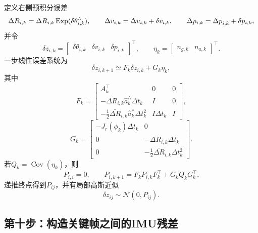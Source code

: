 定义右侧预积分误差
\[
    \Delta R_{i,k}
    =\bar{\Delta R}_{i,k}\operatorname{Exp}(\delta\theta_{i,k}^\wedge),
    \qquad
    \Delta v_{i,k}=\bar{\Delta v}_{i,k}+\delta v_{i,k},
    \qquad
    \Delta p_{i,k}=\bar{\Delta p}_{i,k}+\delta p_{i,k},
\]
并令
\[
    \delta z_{i,k}
    =\begin{bmatrix}\delta\theta_{i,k}&\delta v_{i,k}&\delta p_{i,k}\end{bmatrix}^\top,
    \qquad
    \eta_k
    =\begin{bmatrix}n_{g,k}&n_{a,k}\end{bmatrix}^\top.
\]
一步线性误差系统为
\[
    \delta z_{i,k+1}
    \simeq F_k\delta z_{i,k}+G_k\eta_k,
\]
其中
\[
\boxed{
F_k=
\begin{bmatrix}
    A_k^\top & 0 & 0\\
    -\bar{\Delta R}_{i,k}\widehat a_k^\wedge\Delta t_k
        & I & 0\\
    -\frac12\bar{\Delta R}_{i,k}\widehat a_k^\wedge\Delta t_k^2
        & I\Delta t_k & I
\end{bmatrix},
}
\]
\[
\boxed{
G_k=
\begin{bmatrix}
    -J_r(\phi_k)\Delta t_k & 0\\
    0 & -\bar{\Delta R}_{i,k}\Delta t_k\\
    0 & -\frac12\bar{\Delta R}_{i,k}\Delta t_k^2
\end{bmatrix}.
}
\]
若$Q_k=\operatorname{Cov}(\eta_k)$，则
\[
\boxed{
    P_{i,i}=0,
    \qquad
    P_{i,k+1}=F_kP_{i,k}F_k^\top+G_kQ_kG_k^\top.
}
\]
递推终点得到$P_{ij}$，并有局部高斯近似
\[
    \delta z_{ij}\sim\mathcal N(0,P_{ij}).
\]

\subsection*{第十步：构造关键帧之间的IMU残差}

